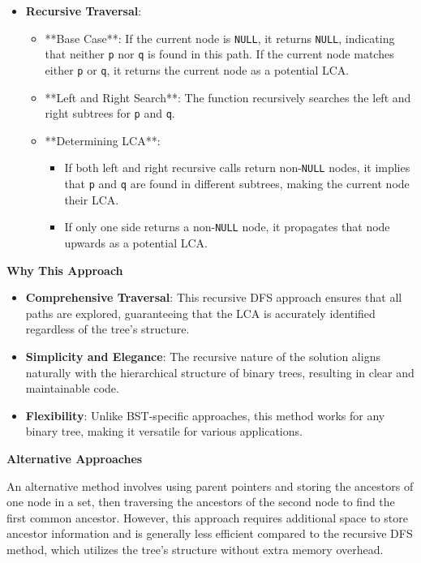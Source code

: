 \begin{itemize}
    \item \textbf{Recursive Traversal}:
    \begin{itemize}
        \item **Base Case**: If the current node is \texttt{NULL}, it returns \texttt{NULL}, indicating that neither \texttt{p} nor \texttt{q} is found in this path. If the current node matches either \texttt{p} or \texttt{q}, it returns the current node as a potential LCA.
        \item **Left and Right Search**: The function recursively searches the left and right subtrees for \texttt{p} and \texttt{q}.
        \item **Determining LCA**: 
        \begin{itemize}
            \item If both left and right recursive calls return non-\texttt{NULL} nodes, it implies that \texttt{p} and \texttt{q} are found in different subtrees, making the current node their LCA.
            \item If only one side returns a non-\texttt{NULL} node, it propagates that node upwards as a potential LCA.
        \end{itemize}
    \end{itemize}
\end{itemize}

\textbf{Why This Approach}

\begin{itemize}
    \item \textbf{Comprehensive Traversal}: This recursive DFS approach ensures that all paths are explored, guaranteeing that the LCA is accurately identified regardless of the tree's structure.
    \item \textbf{Simplicity and Elegance}: The recursive nature of the solution aligns naturally with the hierarchical structure of binary trees, resulting in clear and maintainable code.
    \item \textbf{Flexibility}: Unlike BST-specific approaches, this method works for any binary tree, making it versatile for various applications.
\end{itemize}

\textbf{Alternative Approaches}

An alternative method involves using parent pointers and storing the ancestors of one node in a set, then traversing the ancestors of the second node to find the first common ancestor. However, this approach requires additional space to store ancestor information and is generally less efficient compared to the recursive DFS method, which utilizes the tree's structure without extra memory overhead.

